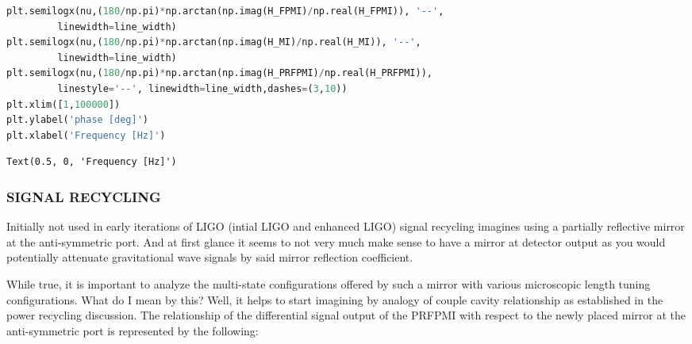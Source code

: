 \begin{spacing}{1.2}\begin{lstlisting}[frame=single, language=Python]
plt.semilogx(nu,(180/np.pi)*np.arctan(np.imag(H_FPMI)/np.real(H_FPMI)), '--', 
	     linewidth=line_width)
plt.semilogx(nu,(180/np.pi)*np.arctan(np.imag(H_MI)/np.real(H_MI)), '--', 
	     linewidth=line_width)
plt.semilogx(nu,(180/np.pi)*np.arctan(np.imag(H_PRFPMI)/np.real(H_PRFPMI)),
	     linestyle='--', linewidth=line_width,dashes=(3,10))
plt.xlim([1,100000])
plt.ylabel('phase [deg]')
plt.xlabel('Frequency [Hz]')
\end{lstlisting}\end{spacing}

\begin{spacing}{1.2}\begin{lstlisting}
Text(0.5, 0, 'Frequency [Hz]')
\end{lstlisting}\end{spacing}

\hypertarget{signal-recyclinginitially-not-used-in-early-iterations-of-ligo-intial-ligo-and-enhanced-ligo-signal-recycling-imagines-using-a-partially-reflective-mirror-at-the-anti-symmetric-port.-and-at-first-glance-it-seems-to-not-very-much-make-sense-to-have-a-mirror-at-detector-output-as-you-would-potentially-attenuate-gravitational-wave-signals-by-said-mirror-reflection-coefficient.}{%
\subsubsection*{SIGNAL RECYCLING}
Initially not used in early iterations of LIGO
(intial LIGO and enhanced LIGO) signal recycling imagines using a
partially reflective mirror at the anti-symmetric port. And at first
glance it seems to not very much make sense to have a mirror at detector
output as you would potentially attenuate gravitational wave signals by
said mirror reflection
coefficient.}\label{signal-recyclinginitially-not-used-in-early-iterations-of-ligo-intial-ligo-and-enhanced-ligo-signal-recycling-imagines-using-a-partially-reflective-mirror-at-the-anti-symmetric-port.-and-at-first-glance-it-seems-to-not-very-much-make-sense-to-have-a-mirror-at-detector-output-as-you-would-potentially-attenuate-gravitational-wave-signals-by-said-mirror-reflection-coefficient.}

While true, it is important to analyze the multi-state configurations
offered by such a mirror with various microscopic length tuning
configurations. What do I mean by this? Well, it helps to start
imagining by analogy of couple cavity relationship as established in the
power recycling discussion. The relationship of the differential signal
output of the PRFPMI with respect to the newly placed mirror at the
anti-symmetric port is represented by the following:

